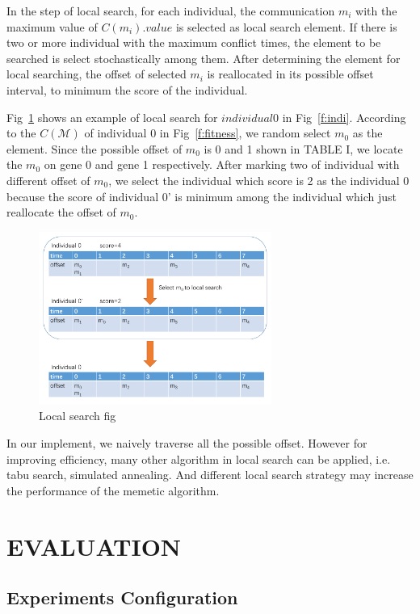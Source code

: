 \documentclass[jornal]{IEEEtran}
\begin{document}
In the step of local search, for each individual, the communication $m_i$ with the maximum value of $C(m_i).value$ is selected as local search element. If there is two or more individual with the maximum conflict times, the element to be searched is select stochastically among them. After determining the element for local searching, the offset of selected $m_i$ is reallocated in its possible offset interval, to minimum the score of the individual.

Fig~\ref{f:local} shows an example of local search for $individual 0$ in Fig~\ref{f:indi}. According to the $C(\mathcal{M})$ of individual 0 in Fig~\ref{f:fitness}, we random select $m_0$ as the element. Since the possible offset of $m_0$ is 0 and 1 shown in TABLE I, we locate the $m_0$ on gene 0 and gene 1 respectively. After marking two of individual with different offset of $m_0$, we select the individual which score is 2 as the individual 0 because the score of individual 0' is minimum among the individual which just reallocate the offset of $m_0$.
\begin{figure}[!t]
	\centering
	\includegraphics[width=3in]{picture/local.pdf}
	\caption{Local search fig}
	\label{f:local}
\end{figure}

In our implement, we naively traverse all the possible offset. However for improving efficiency, many other algorithm in local search can be applied, i.e. tabu search, simulated annealing. And different local search strategy may increase the performance of the memetic algorithm.

\section{EVALUATION\label{s:evalu}}

\subsection{Experiments Configuration}
\end{document}
